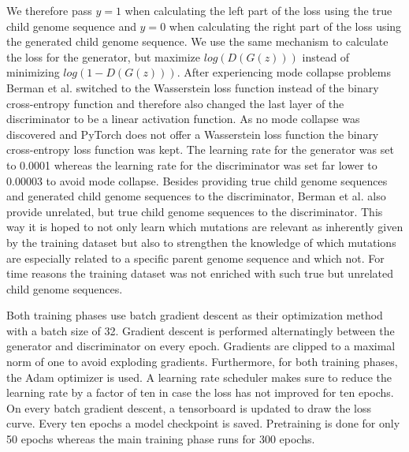 We therefore pass $y=1$ when calculating the left part of the loss using the true child genome sequence and $y=0$ when calculating the right part of the loss using the generated child genome sequence. We use the same mechanism to calculate the loss for the generator, but maximize $log(D(G(z)))$ instead of minimizing $log(1-D(G(z)))$. After experiencing mode collapse problems Berman et al. \cite{Berman2020} switched to the Wasserstein loss function instead of the binary cross-entropy function and therefore also changed the last layer of the discriminator to be a linear activation function. As no mode collapse was discovered and PyTorch does not offer a Wasserstein loss function the binary cross-entropy loss function was kept. The learning rate for the generator was set to 0.0001 whereas the learning rate for the discriminator was set far lower to 0.00003 to avoid mode collapse. Besides providing true child genome sequences and generated child genome sequences to the discriminator, Berman et al. \cite{Berman2020} also provide unrelated, but true child genome sequences to the discriminator. This way it is hoped to not only learn which mutations are relevant as inherently given by the training dataset but also to strengthen the knowledge of which mutations are especially related to a specific parent genome sequence and which not. For time reasons the training dataset was not enriched with such true but unrelated child genome sequences. 

Both training phases use batch gradient descent as their optimization method with a batch size of 32. Gradient descent is performed alternatingly between the generator and discriminator on every epoch. Gradients are clipped to a maximal norm of one to avoid exploding gradients. Furthermore, for both training phases, the Adam optimizer is used. A learning rate scheduler makes sure to reduce the learning rate by a factor of ten in case the loss has not improved for ten epochs. On every batch gradient descent, a tensorboard is updated to draw the loss curve. Every ten epochs a model checkpoint is saved. Pretraining is done for only 50 epochs whereas the main training phase runs for 300 epochs. 

\newpage
